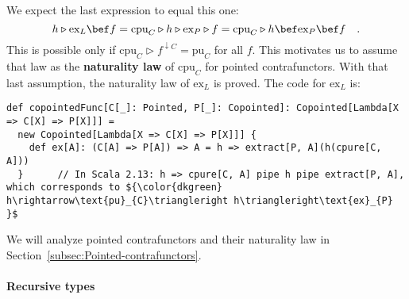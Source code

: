We expect the last expression to equal this one:
\[
h\triangleright\text{ex}_{L}\bef f=\text{cpu}_{C}\triangleright h\triangleright\text{ex}_{P}\triangleright f=\text{cpu}_{C}\triangleright h\bef\text{ex}_{P}\bef f\quad.
\]
This is possible only if $\text{cpu}_{C}\triangleright f^{\downarrow C}=\text{pu}_{C}$
for all $f$. This motivates us to assume that law as the \textbf{naturality
law} of $\text{cpu}_{C}$ for pointed contrafunctors. With that last
assumption, the naturality law of $\text{ex}_{L}$ is proved. The
code for $\text{ex}_{L}$ is:
\begin{lstlisting}[mathescape=true]
def copointedFunc[C[_]: Pointed, P[_]: Copointed]: Copointed[Lambda[X => C[X] => P[X]]] =
  new Copointed[Lambda[X => C[X] => P[X]]] {
    def ex[A]: (C[A] => P[A]) => A = h => extract[P, A](h(cpure[C, A]))
  }      // In Scala 2.13: h => cpure[C, A] pipe h pipe extract[P, A], which corresponds to ${\color{dkgreen} h\rightarrow\text{pu}_{C}\triangleright h\triangleright\text{ex}_{P} }$
\end{lstlisting}
We will analyze pointed contrafunctors and their naturality law in
Section~\ref{subsec:Pointed-contrafunctors}.

\paragraph{Recursive types}

